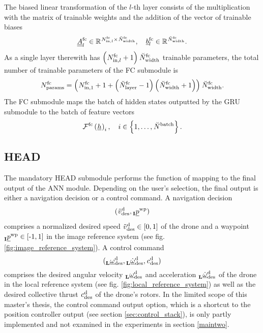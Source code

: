 The biased linear transformation of the $l$-th layer
consists of the multiplication with the matrix of trainable weights
and the addition of the vector of trainable biases
\begin{equation}
    \fcMat{l} \in \R{\fcIn{l} \times \fcOut}
    , \quad
    \fcBias{l} \in \R{\fcOut}
    .
\end{equation}
As a single layer therewith has $\tuple{\fcIn{l} + 1} \fcOut$
trainable parameters,
the total number of trainable parameters of the FC submodule is
\begin{align} \label{eq:fc_param}
    \fcParam = \tuple{
        \fcIn{1} + 1 + 
        \tuple{\fcLayer -1} \tuple{\fcOut +1}
    } \fcOut
    .
\end{align}
The FC submodule maps
the batch of hidden states
outputted by the GRU submodule
to the batch of feature vectors
\begin{equation}
    \fcMap{} \tuple{\hiddenstate[]{}{}{}{}}_i
    , \quad
    i \in \setOfInts{1, \dots, \batchSize}
    .
\end{equation}






\subsection*{HEAD}
The mandatory HEAD submodule
performs the function of mapping
to the final output of the ANN module.
Depending on the user's selection,
the final output is either a navigation decision or a control command.
A navigation decision 
\begin{equation} \label{eq:head_nav_dec}
    \headNavDec
\end{equation}
comprises a normalized desired speed 
$\normDesSpeed \in \setR{0,1}$
of the drone
and a waypoint
$\waypIRS \in \setR{\text{-}1,1}$
in the image reference system
(see fig. \ref{fig:image_reference_system}).
A control command 
\begin{equation} \label{eq:head_ctrl_cmd}
    \headCtrlCmd
\end{equation}
comprises the desired angular velocity
$\desAngVel$
and acceleration
$\desAngAcc$
of the drone in the local reference system 
(see fig. \ref{fig:local_reference_system})
as well as the desired collective thrust 
$\desColThrust$
of the drone's rotors.
In the limited scope of this master's thesis,
the control command output option,
which is a shortcut to the position controller output 
(see section \ref{sec:control_stack}),
is only partly implemented and 
not examined in the experiments in section \ref{maintwo}.

